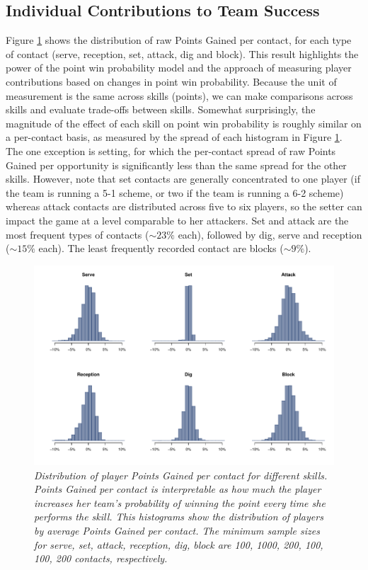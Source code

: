 \documentclass{article}
\begin{document}
\subsection{Individual Contributions to Team Success}
\label{sec:points-gained}

Figure \ref{fig:points-gained-per-opportunity} shows the distribution of raw Points Gained per contact, for each type of contact (serve, reception, set, attack, dig and block). This result highlights the power of the point win probability model and the approach of measuring player contributions based on changes in point win probability. Because the unit of measurement is the same across skills (points), we can make comparisons across skills and evaluate trade-offs between skills. Somewhat surprisingly, the magnitude of the effect of each skill on point win probability is roughly similar on a per-contact basis, as measured by the spread of each histogram in Figure \ref{fig:points-gained-per-opportunity}. The one exception is setting, for which the per-contact spread of raw Points Gained per opportunity is significantly less than the same spread for the other skills. However, note that set contacts are generally concentrated to one player (if the team is running a 5-1 scheme, or two if the team is running a 6-2 scheme) whereas attack contacts are distributed across five to six players, so the setter can impact the game at a level comparable to her attackers. Set and attack are the most frequent types of contacts ($\sim23\%$ each), followed by dig, serve and reception ($\sim15\%$ each). The least frequently recorded contact are blocks ($\sim9\%$).

\begin{figure}
    \centering
    \includegraphics[width=\textwidth]{figures/points_gained_per_opportunity.pdf}
    \caption{\it Distribution of player Points Gained per contact for different skills. Points Gained per contact is interpretable as how much the player increases her team's probability of winning the point every time she performs the skill. This histograms show the distribution of players by average Points Gained per contact. The minimum sample sizes for serve, set, attack, reception, dig, block are 100, 1000, 200, 100, 100, 200 contacts, respectively.}
    \label{fig:points-gained-per-opportunity}
\end{figure}
\end{document}
